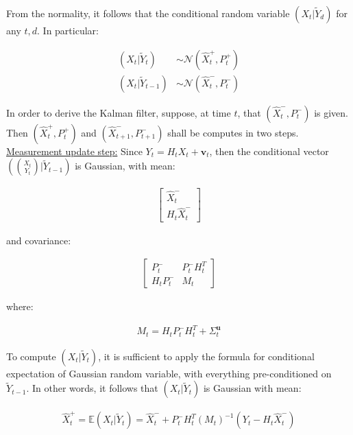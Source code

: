 \documentclass{pracamgr}
\numberwithin{equation}{section}
\begin{document}
From the normality, it follows that the conditional random variable $(X_{t} | \tilde{Y}_{d})$ for any $t, d$. In particular:

\begin{align}
(X_{t} | \tilde{Y}_{t}) &\sim   \mathcal{N} \left(\hat{X}_{t}^{+}, P_{t}^{+} \right) \\
(X_{t} | \tilde{Y}_{t-1}) &\sim  \mathcal{N} \left(\hat{X}_{t}^{-}, P_{t}^{-} \right)
\end{align}

In order to derive the Kalman filter, suppose, at time $t$, that $\left(\hat{X}_{t}^{-}, P_{t}^{-} \right)$ is given. Then $\left(\hat{X}_{t}^{+}, P_{t}^{+} \right)$ and $\left(\hat{X}_{t+1}^{-}, P_{t+1}^{-} \right)$ shall be computes in two steps. \\

\underline{Measurement update step:} Since $Y_{t} = H_{t} X_{t} + \mathbf{v}_{t}$, then the conditional vector $\left( \binom{X_{t}}{Y_{t}}  | \tilde{Y}_{t-1} \right)$ is Gaussian, with mean:

\begin{align}
\left[\begin{array}{c}
\hat{X}_{t}^{-} \\
H_{t} \hat{X}_{t}^{-}
\end{array}\right]
\end{align}

and covariance:

\begin{align}
\left[\begin{array}{cc}
P_{t}^{-} & P_{t}^{-}H_{t}^{T} \\
H_{t}P_{t}^{-} & M_{t}
\end{array}\right]
\end{align}

where:

\begin{align}
M_{t} = H_{t} P_{t}^{-} H_{t}^{T} + \Sigma_{t}^{\mathbf{u}}
\end{align}

To compute $\left(X_{t} |  \tilde{Y}_{t} \right)$, it is sufficient to apply the formula for conditional expectation of Gaussian random variable, with everything pre-conditioned on $\tilde{Y}_{t-1}$. In other words, it follows that $\left(X_{t} |  \tilde{Y}_{t} \right)$ is Gaussian with mean:

\begin{align}
\hat{X}_{t}^{+} = \mathbb{E} (X_{t} | \tilde{Y}_{t} ) = \hat{X}_{t}^{-} + P_{t}^{-} H_{t}^{T} \left(M_{t} \right)^{-1} \left(Y_{t} - H_{t} \hat{X}_{t}^{-} \right)
\end{align}
\end{document}
